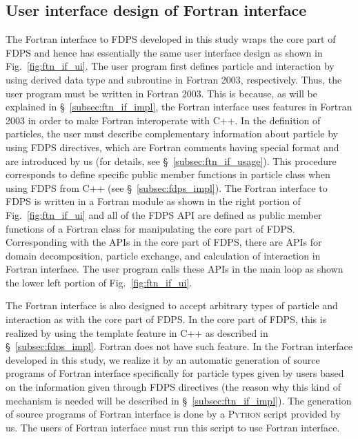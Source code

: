 \documentclass[proof,useamsfonts]{pasj01}
\begin{document}
\subsection{User interface design of Fortran interface}
\label{subsec:ftn_if_ui}
The Fortran interface to FDPS developed in this study wraps the core part of FDPS and hence has essentially the same user interface design as shown in Fig.~\ref{fig:ftn_if_ui}. The user program first defines particle and interaction by using derived data type and subroutine in Fortran 2003, respectively. Thus, the user program must be written in Fortran 2003. This is because, as will be explained in \S~\ref{subsec:ftn_if_impl}, the Fortran interface uses features in Fortran 2003 in order to make Fortran interoperate with C++. In the definition of particles, the user must describe complementary information about particle by using FDPS directives, which are Fortran comments having special format and are introduced by us (for details, see \S~\ref{subsec:ftn_if_usage}). This procedure corresponds to define specific public member functions in particle class when using FDPS from C++ (see \S~\ref{subsec:fdps_impl}). The Fortran interface to FDPS is written in a Fortran module as shown in the right portion of Fig.~\ref{fig:ftn_if_ui} and all of the FDPS API are defined as public member functions of a Fortran class for manipulating the core part of FDPS. Corresponding with the APIs in the core part of FDPS, there are APIs for domain decomposition, particle exchange, and calculation of interaction in Fortran interface. The user program calls these APIs in the main loop as shown the lower left portion of Fig.~\ref{fig:ftn_if_ui}.

The Fortran interface is also designed to accept arbitrary types of particle and interaction as with the core part of FDPS. In the core part of FDPS, this is realized by using the template feature in C++ as described in \S~\ref{subsec:fdps_impl}. Fortran does not have such feature. In the Fortran interface developed in this study, we realize it by an automatic generation of source programs of Fortran interface specifically for particle types given by users based on the information given through FDPS directives (the reason why this kind of mechanism is needed will be described in \S~\ref{subsec:ftn_if_impl}). The generation of source programs of Fortran interface is done by a \textsc{Python} script provided by us. The users of Fortran interface must run this script to use Fortran interface.
\end{document}
